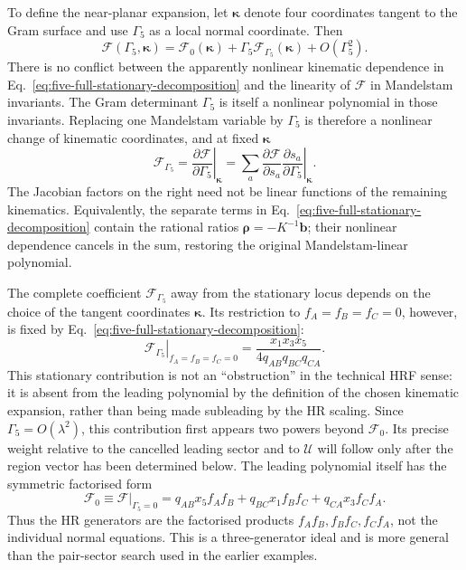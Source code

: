 \documentclass[a4paper,11pt]{article}
\begin{document}
To define the near-planar expansion, let \(\boldsymbol{\kappa}\) denote four
coordinates tangent to the Gram surface and use \(\Gamma_5\) as a local
normal coordinate.  Then
\begin{equation}
 \mathcal F(\Gamma_5,\boldsymbol{\kappa})
 =\mathcal F_0(\boldsymbol{\kappa})
  +\Gamma_5\mathcal F_{\Gamma_5}(\boldsymbol{\kappa})
  +O(\Gamma_5^2).
 \label{eq:five-gram-expansion}
\end{equation}
There is no conflict between the apparently nonlinear kinematic dependence
in Eq.~\eqref{eq:five-full-stationary-decomposition} and the linearity of
\(\mathcal F\) in Mandelstam invariants.  The Gram determinant \(\Gamma_5\)
is itself a nonlinear polynomial in those invariants.  Replacing one
Mandelstam variable by \(\Gamma_5\) is therefore a nonlinear change of
kinematic coordinates, and at fixed \(\boldsymbol\kappa\)
\begin{equation}
 \mathcal F_{\Gamma_5}
 =\left.\frac{\partial\mathcal F}{\partial\Gamma_5}
  \right|_{\boldsymbol\kappa}
 =\sum_a\frac{\partial\mathcal F}{\partial s_a}
  \left.\frac{\partial s_a}{\partial\Gamma_5}
  \right|_{\boldsymbol\kappa}.
 \label{eq:five-gram-chain-rule}
\end{equation}
The Jacobian factors on the right need not be linear functions of the
remaining kinematics.  Equivalently, the separate terms in
Eq.~\eqref{eq:five-full-stationary-decomposition} contain the rational
ratios \(\boldsymbol\rho=-K^{-1}\boldsymbol b\); their nonlinear dependence
cancels in the sum, restoring the original Mandelstam-linear polynomial.

The complete coefficient \(\mathcal F_{\Gamma_5}\) away from the stationary
locus depends on the choice of the tangent coordinates
\(\boldsymbol\kappa\).  Its restriction to \(f_A=f_B=f_C=0\), however, is
fixed by Eq.~\eqref{eq:five-full-stationary-decomposition}:
\begin{equation}
 \left.\mathcal F_{\Gamma_5}\right|_{f_A=f_B=f_C=0}
 =\frac{x_1x_3x_5}{4q_{AB}q_{BC}q_{CA}}.
 \label{eq:five-gram-coefficient-on-locus}
\end{equation}
This stationary contribution is not an
``obstruction'' in the technical HRF sense: it is absent from the leading
polynomial by the definition of the chosen kinematic expansion, rather than
being made subleading by the HR scaling.  Since
\(\Gamma_5=O(\lambda^2)\), this contribution first appears two powers beyond
\(\mathcal F_0\).  Its precise weight relative to the cancelled leading
sector and to \(\mathcal U\) will follow only after the region vector has
been determined below.  The leading polynomial itself has the symmetric
factorised form
\begin{equation}
 \mathcal F_0\equiv\left.\mathcal F\right|_{\Gamma_5=0}
 =q_{AB}x_5f_Af_B+q_{BC}x_1f_Bf_C+q_{CA}x_3f_Cf_A.
 \label{eq:five-coplanar-factorisation}
\end{equation}
Thus the HR generators are the factorised products
\(f_Af_B,f_Bf_C,f_Cf_A\), not the individual normal equations.  This is a
three-generator ideal and is more general than the pair-sector search used
in the earlier examples.
\end{document}
